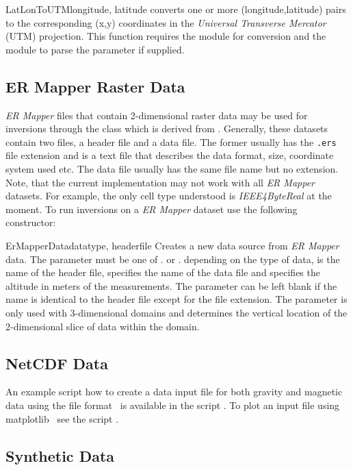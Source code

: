 \begin{funcdesc}{LatLonToUTM}{longitude, latitude%
}
converts one or more (longitude,latitude) pairs to the corresponding (x,y)
coordinates in the \emph{Universal Transverse Mercator} (UTM) projection.
This function requires the  module for conversion and the
 module to parse the  parameter if supplied.
\end{funcdesc}

\subsection{ER Mapper Raster Data}
\emph{ER Mapper} files that contain 2-dimensional raster data may be used for
inversions through the  class which is derived from
.
Generally, these datasets contain two files, a header file and a data file.
The former usually has the \texttt{.ers} file extension and is a text file that
describes the data format, size, coordinate system used etc.
The data file usually has the same file name but no extension.
Note, that the current implementation may not work with all \emph{ER Mapper}
datasets. For example, the only cell type understood is \emph{IEEE4ByteReal}
at the moment.
To run inversions on a \emph{ER Mapper} dataset use the following constructor:
\begin{classdesc}{ErMapperData}{datatype, headerfile%
%
}
Creates a new data source from \emph{ER Mapper} data.
The parameter  must be one of
. or .
depending on the type of data,  is the name of the header
file,  specifies the name of the data file and
 specifies the altitude in meters of the measurements.
The parameter  can be left blank if the name is identical to
the header file except for the file extension. The  parameter
is only used with 3-dimensional domains and determines the vertical location
of the 2-dimensional slice of data within the domain.
\end{classdesc}

\subsection{NetCDF Data}
An example script how to create a data input file for both gravity and magnetic
data using the \netcdf file format~\cite{netcdf} is available in the script
.
To plot an input file using matplotlib~\cite{matplotlib} see the script .

\subsection{Synthetic Data}

